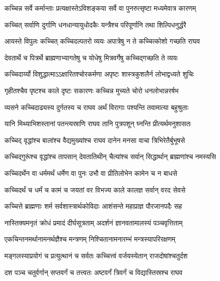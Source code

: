 \twolineshloka
{कच्चिन्न सर्वे कर्मान्ताः प्रत्यक्षास्तेऽविशङ्कया}
{सर्वे वा पुनरुत्सृष्टा मध्यमेवात्र कारणम्} %

\twolineshloka
{कच्चित् सर्वाणि दुर्गाणि धनधान्यायुधोदकैः}
{यन्त्रैश्च परिपूर्णानि तथा शिल्पिधनुर्द्धरै} %

\twolineshloka
{आयस्ते विपुलः कच्चित् कच्चिदल्पतरो व्ययः}
{अपात्रेषु न ते कच्चित्कोशो गच्छति राघव} %

\twolineshloka
{देवतार्थे च पित्रर्थे ब्राह्मणाभ्यागतेषु च}
{योधेषु मित्रवर्गेषु कच्चिद्गच्छति ते व्ययः} %

\twolineshloka
{कच्चिदार्य्यो विशुद्धात्माऽऽक्षारितश्चोरकर्मणा}
{अपृष्टः शास्त्रकुशलैर्न लोभाद्वध्यते शुचिः} %

\twolineshloka
{गृहीतश्चैव पृष्टश्च काले दृष्टः सकारणः}
{कच्चिन्न मुच्यते चोरो धनलोभान्नरर्षभ} %

\twolineshloka
{व्यसने कच्चिदाढ्यस्य दुर्गतस्य च राघव}
{अर्थं विरागाः पश्यन्ति तवामात्या बहुश्रुताः} %

\twolineshloka
{यानि मिथ्याभिशस्तानां पतन्त्यस्राणि राघव}
{तानि पुत्रपशून् घ्नन्ति प्रीत्यर्थमनुशासतः} %

\twolineshloka
{कच्चिद् वृद्धांश्च बालांश्च वैद्यमुख्यांश्च राघव}
{दानेन मनसा वाचा त्रिभिरेतैर्बुभूषसे} %

\twolineshloka
{कच्चिद्गुरूंश्च वृद्धांश्च तापसान् देवतातिथीन्}
{चैत्यांश्च सर्वान् सिद्धार्थान् ब्राह्मणांश्च नमस्यसि} %

\twolineshloka
{कच्चिदर्थेन वा धर्ममर्थं धर्मेण वा पुनः}
{उभौ वा प्रीतिलोभेन कामेन च न बाधसे} %

\twolineshloka
{कच्चिदर्थं च धर्मं च कामं च जयतां वर}
{विभज्य काले कालज्ञ सर्वान् वरद सेवसे} %

\twolineshloka
{कच्चित्ते ब्राह्मणाः शर्म सर्वशास्त्रार्थकोविदाः}
{आशंसन्ते महाप्राज्ञ पौरजानपदैः सह} %

\twolineshloka
{नास्तिक्यमनृतं क्रोधं प्रमादं दीर्घसूत्रताम्}
{अदर्शनं ज्ञानवतामालस्यं पञ्चवृत्तिताम्} %

\twolineshloka
{एकचिन्तनमर्थानामनर्थज्ञैश्च मन्त्रणम्}
{निश्चितानामनारम्भं मन्त्रस्यापरिरक्षणम्} %

\twolineshloka
{मङ्गलस्याप्रयोगं च प्रत्युत्थानं च सर्वतः}
{कच्चित्त्वं वर्जयस्येतान् राजदोषांश्चतुर्दश} %

\twolineshloka
{दश पञ्च चतुर्वर्गान् सप्तवर्गं च तत्त्वतः}
{अष्टवर्गं त्रिवर्गं च विद्यास्तिस्रश्च राघव} %


